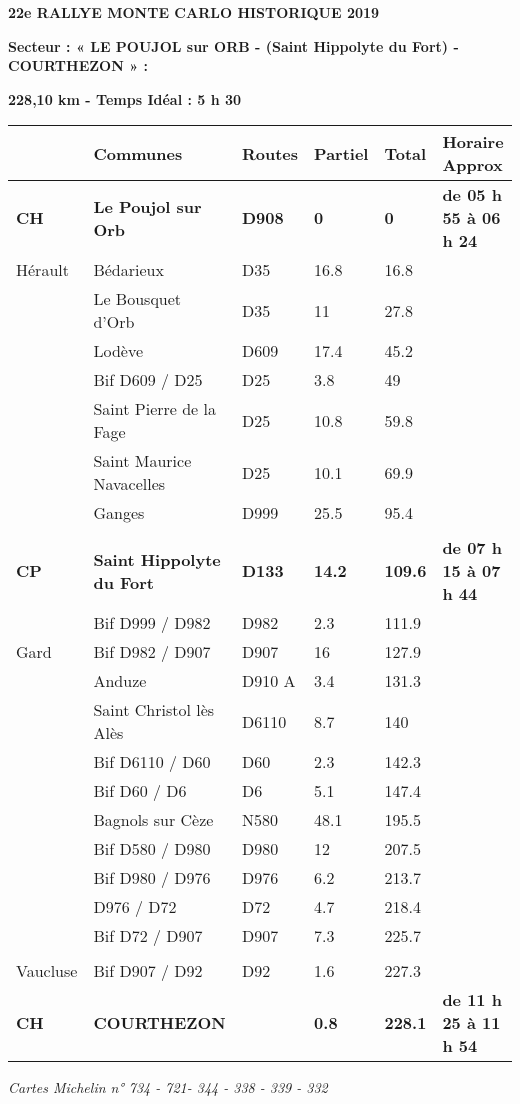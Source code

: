 \documentclass{article}%
\begin{document}
%
\normalsize%
\begin{center} \textbf{\LARGE{22e RALLYE MONTE CARLO HISTORIQUE 2019}} \end{center}%
\begin{flushleft} \textbf{Secteur : « LE POUJOL sur ORB - (Saint Hippolyte du Fort) - COURTHEZON » :
} \end{flushleft}%
\begin{flushright} \textbf{228,10 km - Temps Idéal : 5 h 30} \end{flushright}%
\begin{longtable}{p{2.25cm}|p{7.0cm}|p{1.5cm}|p{1.5cm}|p{1.5cm}|p{3.5cm}}%
\hline%
&Communes&Routes&Partiel&Total&Horaire Approx\\%
\hline%
\endhead%
\endfoot%
\endlastfoot%
\textbf{﻿CH }&\textbf{Le Poujol sur Orb}&\textbf{D908}&\textbf{0}&\textbf{0}&\textbf{de 05 h 55 à 06 h 24}\\%
Hérault&Bédarieux&D35&16.8&16.8& \\%
 &Le Bousquet d'Orb&D35&11&27.8& \\%
 &Lodève&D609&17.4&45.2& \\%
 &Bif D609 / D25&D25&3.8&49& \\%
 &Saint Pierre de la Fage &D25&10.8&59.8& \\%
 &Saint Maurice Navacelles &D25&10.1&69.9& \\%
 &Ganges&D999&25.5&95.4& \\%
\hline& & & & & \\%
\textbf{CP}&\textbf{Saint Hippolyte du Fort}&\textbf{D133}&\textbf{14.2}&\textbf{109.6}&\textbf{de 07 h 15 à 07 h 44}\\%
 &Bif D999 / D982&D982&2.3&111.9& \\%
Gard&Bif D982 / D907&D907&16&127.9& \\%
 &Anduze&D910 A&3.4&131.3& \\%
 &Saint Christol lès Alès&D6110&8.7&140& \\%
 &Bif D6110 / D60&D60 &2.3&142.3& \\%
 &Bif D60 / D6&D6&5.1&147.4& \\%
 &Bagnols sur Cèze&N580&48.1&195.5& \\%
 &Bif D580 / D980&D980&12&207.5& \\%
 &Bif D980 / D976&D976&6.2&213.7& \\%
 &D976 / D72&D72&4.7&218.4& \\%
 &Bif D72 / D907&D907&7.3&225.7& \\%
\hline& & & & & \\%
Vaucluse&Bif D907 / D92&D92&1.6&227.3& \\%
\textbf{      CH}&\textbf{COURTHEZON}& &\textbf{0.8}&\textbf{228.1}&\textbf{de 11 h 25 à 11 h 54}\\%
\hline%
\end{longtable}%
\begin{flushleft} \textit{Cartes Michelin n° 734 - 721- 344 - 338 - 339 - 332
} \end{flushleft}%
\end{document}
